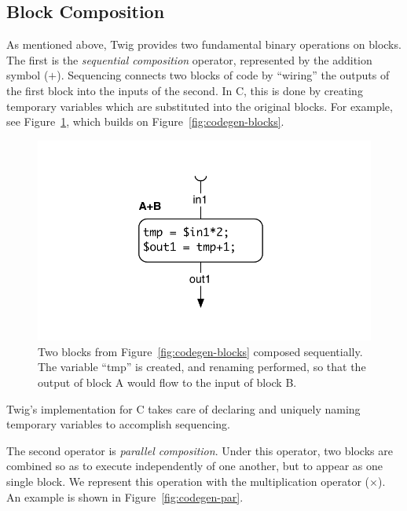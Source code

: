 \subsection{Block Composition}

As mentioned above, Twig provides two fundamental binary operations on blocks.
The first is the \emph{sequential composition} operator, represented by the
addition symbol ($+$). Sequencing connects two blocks of code by ``wiring'' the
outputs of the first block into the inputs of the second. In C, this is done by
creating temporary variables which are substituted into the original blocks. For
example, see Figure~\ref{fig:codegen-seq}, which builds on
Figure~\ref{fig:codegen-blocks}.

\begin{figure}[ht]
\centering
\includegraphics[width=\columnwidth]{images/code-gen2}
\caption{Two blocks from Figure~\ref{fig:codegen-blocks} composed sequentially.
The variable ``tmp'' is created, and renaming performed, so that the output of
block A would flow to the input of block B.}
\label{fig:codegen-seq}
\end{figure}

Twig's implementation for C takes care of declaring and uniquely naming
temporary variables to accomplish sequencing.

The second operator is \emph{parallel composition}. Under this operator, two
blocks are combined so as to execute independently of one another, but to appear
as one single block. We represent this operation with the multiplication
operator ($\times$). An example is shown in Figure~\ref{fig:codegen-par}.

